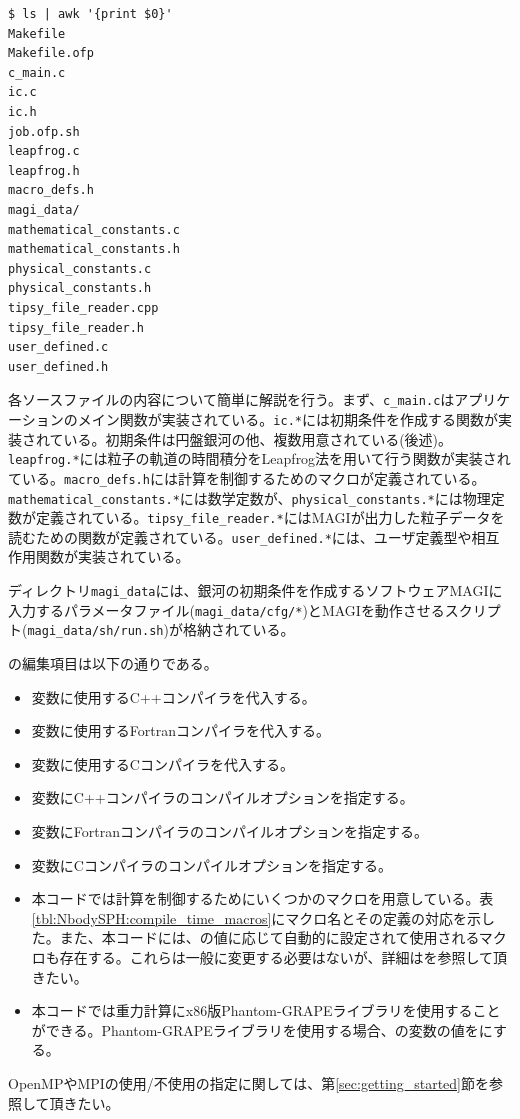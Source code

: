 \endifFtn
\ifC %
\begin{screen}
\begin{verbatim}
$ ls | awk '{print $0}'
Makefile
Makefile.ofp
c_main.c
ic.c
ic.h
job.ofp.sh
leapfrog.c
leapfrog.h
macro_defs.h
magi_data/
mathematical_constants.c
mathematical_constants.h
physical_constants.c
physical_constants.h
tipsy_file_reader.cpp
tipsy_file_reader.h
user_defined.c
user_defined.h
\end{verbatim}
\end{screen}
各ソースファイルの内容について簡単に解説を行う。まず、\texttt{c\_main.c}はアプリケーションのメイン関数が実装されている。\texttt{ic.*}には初期条件を作成する関数が実装されている。初期条件は円盤銀河の他、複数用意されている(後述)。\texttt{leapfrog.*}には粒子の軌道の時間積分をLeapfrog法を用いて行う関数が実装されている。\texttt{macro\_defs.h}には計算を制御するためのマクロが定義されている。\texttt{mathematical\_constants.*}には数学定数が、\texttt{physical\_constants.*}には物理定数が定義されている。\texttt{tipsy\_file\_reader.*}には\textsc{MAGI}が出力した粒子データを読むための関数が定義されている。\texttt{user\_defined.*}には、ユーザ定義型や相互作用関数が実装されている。
\endifC


ディレクトリ\texttt{magi\_data}には、銀河の初期条件を作成するソフトウェア\textsc{MAGI}に入力するパラメータファイル(\texttt{magi\_data/cfg/*})と\textsc{MAGI}を動作させるスクリプト(\texttt{magi\_data/sh/run.sh})が格納されている。

\label{s3sec:NbodySPH_Makefile}
の編集項目は以下の通りである。
\begin{itemize}
\item 変数に使用するC++コンパイラを代入する。
\ifFtn %
\item 変数に使用するFortranコンパイラを代入する。
\endifFtn
\ifC %
\item 変数に使用するCコンパイラを代入する。
\endifC
\item 変数にC++コンパイラのコンパイルオプションを指定する。
\ifFtn %
\item 変数にFortranコンパイラのコンパイルオプションを指定する。
\endifFtn
\ifC %
\item 変数にCコンパイラのコンパイルオプションを指定する。
\endifC
\item 本コードでは計算を制御するためにいくつかのマクロを用意している。表\ref{tbl:NbodySPH:compile_time_macros}にマクロ名とその定義の対応を示した。また、本コードには、の値に応じて自動的に設定されて使用されるマクロも存在する。これらは一般に変更する必要はないが、詳細はを参照して頂きたい。
\item 本コードでは重力計算にx86版Phantom-GRAPEライブラリを使用することができる。Phantom-GRAPEライブラリを使用する場合、の変数の値をにする。
\end{itemize}
OpenMPやMPIの使用/不使用の指定に関しては、第\ref{sec:getting_started}節を参照して頂きたい。

